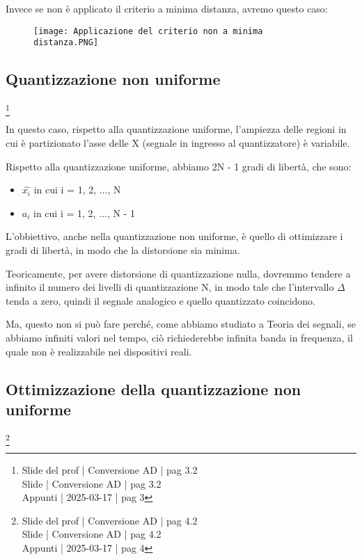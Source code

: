 Invece se non è applicato il criterio a minima distanza, avremo questo caso: 

\begin{figure}[h]
    \centering
    \texttt{[image: Applicazione del criterio non a minima distanza.PNG]}
\end{figure}


\newpage 

\subsection{Quantizzazione non uniforme}
\footnote{Slide del prof | Conversione AD | pag 3.2\\  
Slide | Conversione AD | pag 3.2 \\
Appunti | 2025-03-17 | pag 3
}

In questo caso, rispetto alla quantizzazione uniforme, 
l'ampiezza delle regioni in cui è partizionato l'asse delle X (segnale in ingresso al quantizzatore) è variabile. \newline 

Rispetto alla quantizzazione uniforme, abbiamo 2N - 1 gradi di libertà, che sono: 

\begin{itemize}
    \item $\hat{x_i}$ in cui i = 1, 2, $\dots$, N 
    \item $a_i$ in cui i = 1, 2, $\dots$, N - 1
\end{itemize}

L'obbiettivo, anche nella quantizzazione non uniforme, è quello di ottimizzare i gradi di libertà, 
in modo che la distorsione sia minima. \newline 

Teoricamente, per avere distorsione di quantizzazione nulla, dovremmo tendere a infinito il numero dei livelli di quantizzazione N, 
in modo tale che l'intervallo $\Delta$ tenda a zero, quindi il segnale analogico e quello quantizzato coincidono. \newline 

Ma, questo non si può fare perché, come abbiamo studiato a Teoria dei segnali, se abbiamo infiniti valori nel tempo, ciò richiederebbe infinita banda in frequenza, 
il quale non è realizzabile nei dispositivi reali. \newline

\newpage 

\subsection{Ottimizzazione della quantizzazione non uniforme}
\footnote{Slide del prof | Conversione AD | pag 4.2\\  
Slide | Conversione AD | pag 4.2 \\ 
Appunti | 2025-03-17 | pag 4
}

